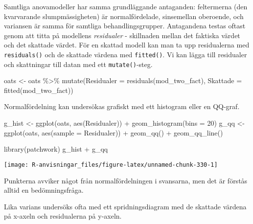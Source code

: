 \documentclass[
]{book}
\newenvironment{Shaded}{\begin{snugshade}}{\end{snugshade}}
\newcommand{\AttributeTok}[1]{\textcolor[rgb]{0.77,0.63,0.00}{#1}}
\newcommand{\DecValTok}[1]{\textcolor[rgb]{0.00,0.00,0.81}{#1}}
\newcommand{\FunctionTok}[1]{\textcolor[rgb]{0.00,0.00,0.00}{#1}}
\newcommand{\NormalTok}[1]{#1}
\newcommand{\OtherTok}[1]{\textcolor[rgb]{0.56,0.35,0.01}{#1}}
\newcommand{\SpecialCharTok}[1]{\textcolor[rgb]{0.00,0.00,0.00}{#1}}
\theoremstyle{definition}
\theoremstyle{definition}
\theoremstyle{definition}
\theoremstyle{definition}
\theoremstyle{remark}
\begin{document}
Samtliga anovamodeller har samma grundläggande antaganden: feltermerna (den kvarvarande slumpmässigheten) är normalfördelade, sinsemellan oberoende, och variansen är samma för samtliga behandlingsgrupper. Antagandena testas oftast genom att titta på modellens \emph{residualer} - skillnaden mellan det faktiska värdet och det skattade värdet. För en skattad modell kan man ta upp residualerna med \texttt{residuals()} och de skattade värdena med \texttt{fitted()}. Vi kan lägga till residualer och skattningar till datan med ett \texttt{mutate()}-steg.

\begin{Shaded}
\begin{Highlighting}[]
\NormalTok{oats }\OtherTok{\textless{}{-}}\NormalTok{ oats }\SpecialCharTok{\%\textgreater{}\%} 
  \FunctionTok{mutate}\NormalTok{(}\AttributeTok{Residualer =} \FunctionTok{residuals}\NormalTok{(mod\_two\_fact),}
         \AttributeTok{Skattade =} \FunctionTok{fitted}\NormalTok{(mod\_two\_fact))}
\end{Highlighting}
\end{Shaded}

Normalfördelning kan undersökas grafiskt med ett histogram eller en QQ-graf.

\begin{Shaded}
\begin{Highlighting}[]
\NormalTok{g\_hist }\OtherTok{\textless{}{-}} \FunctionTok{ggplot}\NormalTok{(oats, }\FunctionTok{aes}\NormalTok{(Residualer)) }\SpecialCharTok{+} \FunctionTok{geom\_histogram}\NormalTok{(}\AttributeTok{bins =} \DecValTok{20}\NormalTok{)}
\NormalTok{g\_qq }\OtherTok{\textless{}{-}} \FunctionTok{ggplot}\NormalTok{(oats, }\FunctionTok{aes}\NormalTok{(}\AttributeTok{sample =}\NormalTok{ Residualer)) }\SpecialCharTok{+} \FunctionTok{geom\_qq}\NormalTok{() }\SpecialCharTok{+} \FunctionTok{geom\_qq\_line}\NormalTok{()}

\FunctionTok{library}\NormalTok{(patchwork)}
\NormalTok{g\_hist }\SpecialCharTok{+}\NormalTok{ g\_qq}
\end{Highlighting}
\end{Shaded}

\begin{center}\texttt{[image: R-anvisningar\_files/figure-latex/unnamed-chunk-330-1]} \end{center}

Punkterna avviker något från normalfördelningen i svansarna, men det är förstås alltid en bedömningsfråga.

Lika varians undersöks ofta med ett spridningsdiagram med de skattade värdena på x-axeln och residualerna på y-axeln.
\end{document}
